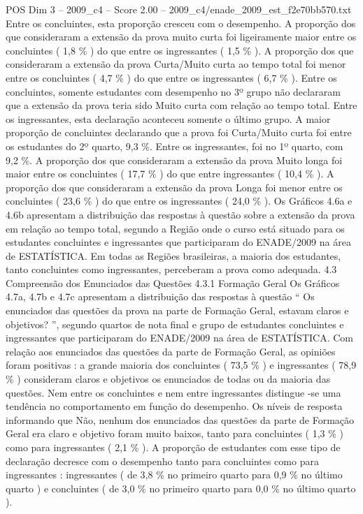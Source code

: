 \begin{textsample}{POS Dim 3 – 2009\_c4 – Score 2.00 – 2009\_c4/enade\_2009\_est\_f2e70bb570.txt}
Entre os concluintes, esta proporção cresceu com o desempenho.
A proporção dos que consideraram a extensão da prova muito curta foi ligeiramente maior entre os concluintes ( 1,8 \% ) do que entre os ingressantes ( 1,5 \% ).
A proporção dos que consideraram a extensão da prova Curta/Muito curta ao tempo total foi menor entre os concluintes ( 4,7 \% ) do que entre os ingressantes ( 6,7 \% ).
Entre os concluintes, somente estudantes com desempenho no 3º grupo não declararam que a extensão da prova teria sido Muito curta com relação ao tempo total.
Entre os ingressantes, esta declaração aconteceu somente o último grupo.
A maior proporção de concluintes declarando que a prova foi Curta/Muito curta foi entre os estudantes do 2º quarto, 9,3 \%.
Entre os ingressantes, foi no 1º quarto, com 9,2 \%.
A proporção dos que consideraram a extensão da prova Muito longa foi maior entre os concluintes ( 17,7 \% ) do que entre ingressantes ( 10,4 \% ).
A proporção dos que consideraram a extensão da prova Longa foi menor entre os concluintes ( 23,6 \% ) do que entre os ingressantes ( 24,0 \% ).
Os Gráficos 4.6a e 4.6b apresentam a distribuição das respostas à questão sobre a extensão da prova em relação ao tempo total, segundo a Região onde o curso está situado para os estudantes concluintes e ingressantes que participaram do ENADE/2009 na área de ESTATÍSTICA.
Em todas as Regiões brasileiras, a maioria dos estudantes, tanto concluintes como ingressantes, perceberam a prova como adequada. 4.3 Compreensão dos Enunciados das Questões 4.3.1 Formação Geral Os Gráficos 4.7a, 4.7b e 4.7c apresentam a distribuição das respostas à questão “ Os enunciados das questões da prova na parte de Formação Geral, estavam claros e objetivos? ”, segundo quartos de nota final e grupo de estudantes concluintes e ingressantes que participaram do ENADE/2009 na área de ESTATÍSTICA.
Com relação aos enunciados das questões da parte de Formação Geral, as opiniões foram positivas : a grande maioria dos concluintes ( 73,5 \% ) e ingressantes ( 78,9 \% ) consideram claros e objetivos os enunciados de todas ou da maioria das questões.
Nem entre os concluintes e nem entre ingressantes distingue -se uma tendência no comportamento em função do desempenho.
Os níveis de resposta informando que Não, nenhum dos enunciados das questões da parte de Formação Geral era claro e objetivo foram muito baixos, tanto para concluintes ( 1,3 \% ) como para ingressantes ( 2,1 \% ).
A proporção de estudantes com esse tipo de declaração decresce com o desempenho tanto para concluintes como para ingressantes : ingressantes ( de 3,8 \% no primeiro quarto para 0,9 \% no último quarto ) e concluintes ( de 3,0 \% no primeiro quarto para 0,0 \% no último quarto ).

\end{textsample}
